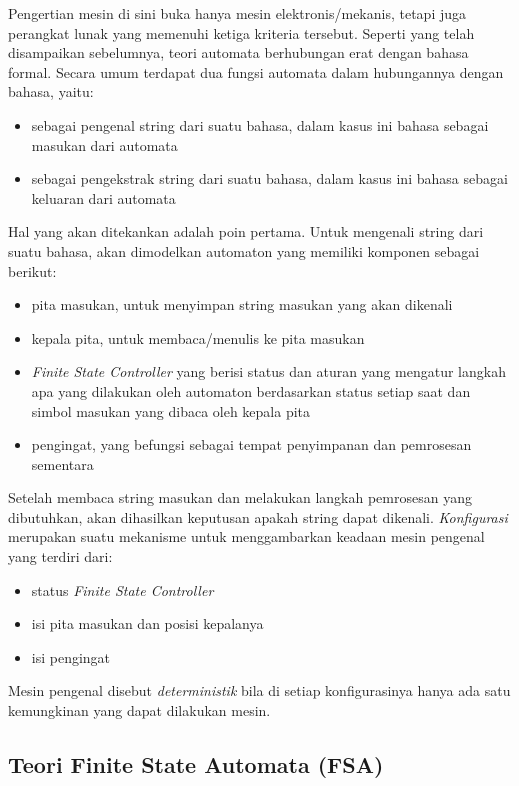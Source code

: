 Pengertian mesin di sini buka hanya mesin elektronis/mekanis, tetapi juga perangkat lunak yang memenuhi ketiga kriteria tersebut. Seperti yang telah disampaikan sebelumnya, teori automata berhubungan erat dengan bahasa formal. Secara umum terdapat dua fungsi automata dalam hubungannya dengan bahasa, yaitu:

\begin{itemize}
	\item sebagai pengenal string dari suatu bahasa, dalam kasus ini bahasa sebagai masukan dari automata
	\item sebagai pengekstrak string dari suatu bahasa, dalam kasus ini bahasa sebagai keluaran dari automata
\end{itemize}

Hal yang akan ditekankan adalah poin pertama. Untuk mengenali string dari suatu bahasa, akan dimodelkan automaton yang memiliki komponen sebagai berikut:

\begin{itemize}
	\item pita masukan, untuk menyimpan string masukan yang akan dikenali
	\item kepala pita, untuk membaca/menulis ke pita masukan 
	\item \textit{Finite State Controller} yang berisi status dan aturan yang mengatur langkah apa yang dilakukan oleh automaton berdasarkan status setiap saat dan simbol masukan yang dibaca oleh kepala pita
	\item pengingat, yang befungsi sebagai tempat penyimpanan dan pemrosesan sementara
\end{itemize}

Setelah membaca string masukan dan melakukan langkah pemrosesan yang dibutuhkan, akan dihasilkan keputusan apakah string dapat dikenali. \textit{Konfigurasi} merupakan suatu mekanisme untuk menggambarkan keadaan mesin pengenal yang terdiri dari:

\begin{itemize}
	\item status \textit{Finite State Controller}
	\item isi pita masukan dan posisi kepalanya
	\item isi pengingat
\end{itemize}

Mesin pengenal disebut \textit{deterministik} bila di setiap konfigurasinya hanya ada satu kemungkinan yang dapat dilakukan mesin.

\subsection{Teori Finite State Automata (FSA)}

